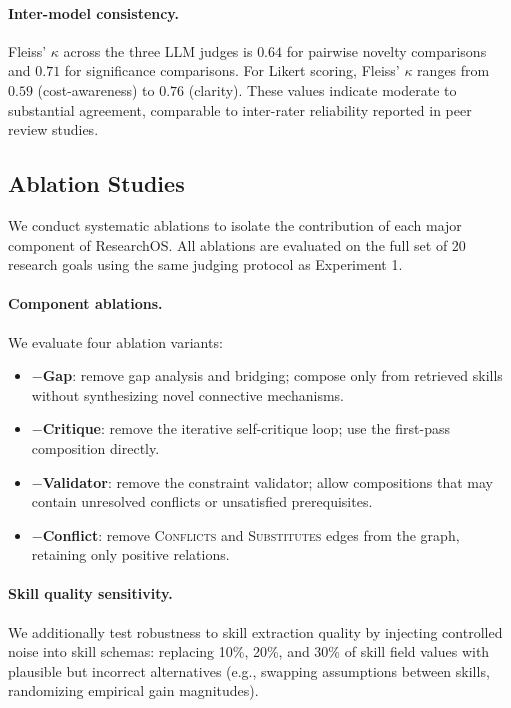 \paragraph{Inter-model consistency.}
Fleiss' $\kappa$ \cite{fleiss1971kappa} across the three LLM judges is $0.64$ for pairwise novelty comparisons and $0.71$ for significance comparisons. For Likert scoring, Fleiss' $\kappa$ ranges from $0.59$ (cost-awareness) to $0.76$ (clarity). These values indicate moderate to substantial agreement, comparable to inter-rater reliability reported in peer review studies.


\subsection{Ablation Studies}
\label{subsec:ablations}

We conduct systematic ablations to isolate the contribution of each major component of ResearchOS. All ablations are evaluated on the full set of 20 research goals using the same judging protocol as Experiment 1.

\paragraph{Component ablations.}
We evaluate four ablation variants:
\begin{itemize}[leftmargin=1.5em]
    \item \textbf{$-$Gap}: remove gap analysis and bridging; compose only from retrieved skills without synthesizing novel connective mechanisms.
    \item \textbf{$-$Critique}: remove the iterative self-critique loop; use the first-pass composition directly.
    \item \textbf{$-$Validator}: remove the constraint validator; allow compositions that may contain unresolved conflicts or unsatisfied prerequisites.
    \item \textbf{$-$Conflict}: remove \textsc{Conflicts} and \textsc{Substitutes} edges from the graph, retaining only positive relations.
\end{itemize}

\paragraph{Skill quality sensitivity.}
We additionally test robustness to skill extraction quality by injecting controlled noise into skill schemas: replacing 10\%, 20\%, and 30\% of skill field values with plausible but incorrect alternatives (e.g., swapping assumptions between skills, randomizing empirical gain magnitudes).

